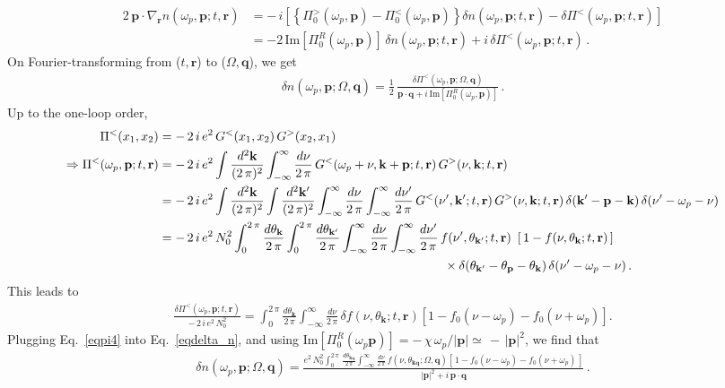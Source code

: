 \documentclass[aps, prb, onecolumn, nofootinbib, citeautoscript, 10pt]{revtex4-2}
\def \nn{\nonumber \\}
\newcommand{\bk}{\mathbf{k}}
\newcommand{\bp}{\mathbf{p}}
\newcommand{\bq}{\mathbf{q}}
\newcommand{\br}{\mathbf{r}}
\begin{document}
\begin{align}
2 \, \bp \cdot \nabla_{\br} n( \omega_p, \bp ;t, \br )  & = 
-\,i \left[\left \lbrace  \Pi_0^>(\omega_p, \bp)-\Pi_0^<(\omega_p , \bp) \right \rbrace
\delta n(\omega_p , \bp ;t, \br ) -\delta\Pi^<( \omega_p,\bp ;t, \br ) \right]
\nn
& = - 2\, \text{Im}[\Pi_0^R( \omega_p, \bp)]\,\delta n( \omega_p ,\bp ;t, \br ) 
+  i\, \delta\Pi^<( \omega_p ,\bp ;t, \br )\,.
\label{eqbosQBE4}
\end{align}
On Fourier-transforming from ($t, \br $) to ($  \Omega, \bq $), we get  
\begin{align}
\delta n( \omega_p , \bp ;  \Omega, \bq ) = \frac{1}{2}
\, \frac{\delta \Pi^<( \omega_p, \bp;  \Omega, \bq )}
{\bp \cdot \bq +  i \,  \text{Im}[\Pi_0^R( \omega_p ,\bp )] }\,.
\label{eqdelta_n}
\end{align} 
Up to the one-loop order,
\begin{align}
\Pi^<(x_1,x_2) &= -\,2\,i \, e^2 \, G^<(x_1,x_2) \, G^>(x_2,x_1)  \nn
\Rightarrow   \Pi^< ( \omega_p , \bp ;t, \br ) & = -\,2\, i \,e^2 
\int \frac{d^2\bk}{( 2 \, \pi )^2}    \int_{-\infty}^{\infty}\frac{d\nu}{ 2 \, \pi } 
\,G^<( \omega_p + \nu, \bk +\bp ;t, \br ) 
\, G^>( \nu , \bk ;t, \br ) \nn
& = -\,2 \,i \,e^2 \int \frac{d^2\bk}{( 2 \, \pi )^2}  \int \frac{d^2\bk'}{( 2 \, \pi )^2}  
\int_{-\infty}^{\infty}   \frac{d\nu}{ 2 \, \pi }
\int_{-\infty}^{\infty} \frac{d\nu'}{ 2 \, \pi } 
\,    G^<( \nu', \bk'; t, \br ) \, G^>( \nu ,\bk ;t, \br )
\,\delta(\bk'-\bp-\bk)\, \delta(\nu'-\omega_p-\nu) \nn
& = - \, 2 \, i \, e^2\, N_0^2 
\int_0^{ 2 \, \pi }\frac{d\theta_\bk}{ 2 \, \pi }
\int_0^{ 2 \, \pi }
\frac{d\theta_{\bk'}}{ 2 \, \pi }
\int_{-\infty}^{\infty}\frac{d\nu} { 2 \, \pi }
\int_{-\infty}^{\infty}\frac{d\nu'}{ 2 \, \pi } \,f( \nu' , \theta_{\bk'};t, \br ) \
\, [ \, 1-f( \nu ,\theta_\bk ;t, \br ) \, ]
\nn & \hspace{ 8 cm }
\times \delta(\theta_{\bk'}-\theta_\bp-\theta_\bk) \, \delta(\nu'-\omega_p-\nu)\,.
\label{pi equation 3}
\end{align}  
This leads to
\begin{align}
\frac{ \delta \Pi^<( \omega_p, \bp;t, \br ) } 
{ -\,2 \,i\, e^2 \, N_0^2 } =
\int_0^{ 2 \, \pi } \frac{d\theta_\bk}{ 2 \, \pi } 
\int_{-\infty}^{\infty}\frac{d\nu}{ 2 \, \pi } \,\delta f( \nu, \theta_{\bk}; t, \br )
\left [ 1-f_0(\nu-\omega_p)-f_0(\nu  +  \omega_p) \right ]. 
\label{eqpi4}
\end{align}
Plugging Eq.~\eqref{eqpi4} into Eq.~\eqref{eqdelta_n}, and using $\text{Im} [\Pi_0^R( \omega_p \bp)] = - \,\chi\, \omega_p/|\bp| \simeq \, - \,|\bp|^2$, we find that
\begin{align}
\delta n( \omega_p, \bp;  \Omega, \bq ) = \frac{ e^2 \, N_0^2 \int_0^{ 2 \, \pi } 
\,   \frac{d\theta_{\bk\bq}}{ 2 \, \pi } 
\int_{-\infty}^{\infty}\frac{d\nu}{ 2 \, \pi } \,
f( \nu, \theta_{\bk\bq} ;  \Omega, \bq )
\left [ \,1-f_0(\nu-\omega_p)-f_0(\nu  +  \omega_p) \, \right ]} 
{|\bp|^2  +  i \,\bp \cdot \bq} \,.
\end{align}
\end{document}
